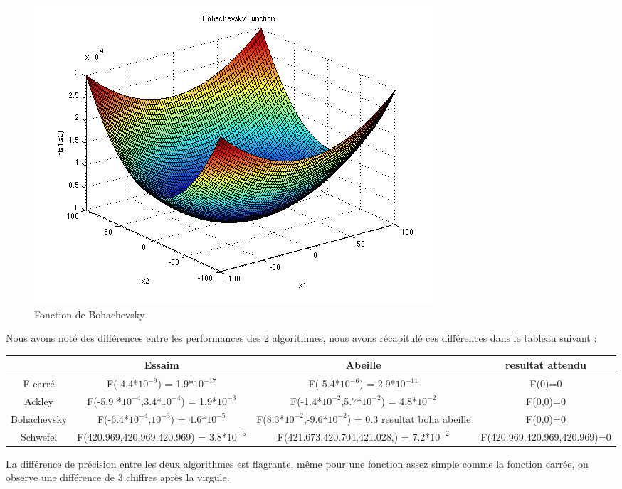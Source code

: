 \documentclass[12pt]{article}
\begin{document}
\begin{figure}[H]
	\centering\includegraphics[scale=0.35]{boha.png}
    \caption{Fonction de Bohachevsky}
\end{figure}

\newpage
\vspace*{2cm}
Nous avons noté des différences entre les performances des 2 algorithmes, nous avons récapitulé ces différences dans le tableau suivant : 
\\

\begin{tiny}

\noindent\begin{tabular}{|*{4}{c|}}
    \hline
     & Essaim & Abeille & resultat attendu \tabularnewline
     \hline
   F carré& F(-4.4*$10^{-9}$) = 1.9*$10^{-17}$
& F(-5.4*$10^{-6}$) = 2.9*$10^{-11}$ & F(0)=0
\tabularnewline
    \hline
    Ackley & F(-5.9 *$10^{-4}$,3.4*$10^{-4}$) = 1.9*$10^{-3}$
    & F(-1.4*$10^{-2}$,5.7*$10^{-2}$) = 4.8*$10^{-2}$ & F(0,0)=0  \tabularnewline
    \hline
    Bohachevsky & F(-6.4*$10^{-4}$,$10^{-3}$) = 4.6*$10^{-5}$ &
    F(8.3*$10^{-2}$,-9.6*$10^{-2}$) = 0.3 resultat boha abeille & F(0,0)=0 
    \tabularnewline
    \hline
    Schwefel & F(420.969,420.969,420.969) = 3.8*$10^{-5}$ & 
    F(421.673,420.704,421.028,) = 7.2*$10^{-2}$& F(420.969,420.969,420.969)=0
    \tabularnewline
    \hline

    
 \end{tabular}
\end{tiny}
\newline

La différence de précision entre les deux algorithmes est flagrante, même pour une fonction assez simple comme la fonction carrée, on observe une différence de 3 chiffres après la virgule. 
\end{document}
